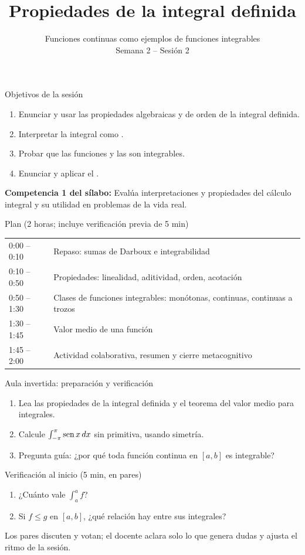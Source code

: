 \documentclass[10pt,aspectratio=169]{beamer}
\title[Propiedades de la integral]{Propiedades de la integral definida}
\subtitle{Funciones continuas como ejemplos de funciones integrables\\[2pt]\small Semana 2 -- Sesión 2}
\begin{document}
\begin{frame}
  \titlepage
\end{frame}

\begin{frame}{Objetivos de la sesión}
  \begin{enumerate}
    \item Enunciar y usar las propiedades algebraicas y de orden de la integral definida.
    \item Interpretar la integral como .
    \item Probar que las funciones  y las  son integrables.
    \item Enunciar y aplicar el .
  \end{enumerate}
  \vspace{1mm}
  {\small\textbf{Competencia 1 del sílabo:} Evalúa interpretaciones y propiedades del cálculo integral y su utilidad en problemas de la vida real.}
  \begin{block}{Plan (2 horas; incluye verificación previa de 5 min)}
    \begin{tabular}{ll}
      0:00 -- 0:10 & Repaso: sumas de Darboux e integrabilidad\\
      0:10 -- 0:50 & Propiedades: linealidad, aditividad, orden, acotación\\
      0:50 -- 1:30 & Clases de funciones integrables: monótonas, continuas, continuas a trozos\\
      1:30 -- 1:45 & Valor medio de una función\\
      1:45 -- 2:00 & Actividad colaborativa, resumen y cierre metacognitivo
    \end{tabular}
  \end{block}
\end{frame}

\begin{frame}{Aula invertida: preparación y verificación}
  \small
  \begin{previa}
    \begin{enumerate}
      \item Lea las propiedades de la integral definida y el teorema del valor medio para integrales.
      \item Calcule $\int_{-\pi}^{\pi}\operatorname{sen} x\,dx$ sin primitiva, usando simetría.
      \item Pregunta guía: ¿por qué toda función continua en $[a,b]$ es integrable?
    \end{enumerate}
  \end{previa}
  \begin{block}{Verificación al inicio (5 min, en pares)}
    \begin{enumerate}
      \item ¿Cuánto vale $\int_a^af$?
      \item Si $f\le g$ en $[a,b]$, ¿qué relación hay entre sus integrales?
    \end{enumerate}
    Los pares discuten y votan; el docente aclara solo lo que genera dudas y ajusta el ritmo de la sesión.
  \end{block}
\end{frame}
\end{document}
